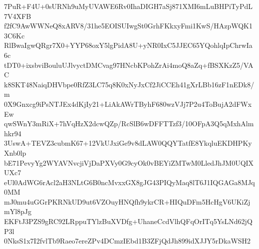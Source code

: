 7PuR+F4U+0sURNh9uMyUVAWE6Rv0IhaDIGH7aSj871XMI6mLuBHPiTyPdL7V4XFB
f2fC9AwWWNeQ8xARV8/31he5EOISUIwgSt0GrhFKkxyFmi1KwS/HAzpWQK13C6Kc
RlBwaIgwQRgr7X0+YYP68oxY5lgPidA8U+yNR0IxC5JJEC65YQohlqIpChrwIa6c
tDT0+ixsbviBouluUJlvyctDMCvag97HNcbKPohZrAi4moQ8aZq+fBSXKzZ5/VAC
k8SKT48NaiqDHVbpe0RfZ3LC75q8K0xNyJxCf2JiCCEh41gXrLBb16zF1nEDk8/m
0X9Gnxcg9iPsNTJEx4dKjIy21+LiAkAWrTByhF680wzVJj7P2u4ToBujA2dFWxEw
qwSWnY3mRiX+7hVqHzX2dcwQZp/RcSlB6wDFFTTzf3/10OFpA3Q5qMxhAlmhkr94
3UswA+TEVZ3cubmK67+12VkUJxiGe9v8dLAW0QQYTatfE8YkqluEKDHPKyXnb0lp
bE71PevyYg2WYAVNvcjiVjDaPXVy0G9cyOk0vBEYiZMTwM0LledJhJM0UQIXUXc7
eUl0AdWG6rAcl2aH3NLtG6B0ncMvxxGX8gJG43PIQyMaq8lT6J1IQGAGa8MJq0MM
mJ0mu4uGGrPKRNkUD9ut6VZOuyHNQfh9ykrCR+HIQuDFm5HcHgV6UKiZjmYl8pJg
EKFtJ3PZS9gRC92LRppuTYlzBuXVDfg+UhaneCcdVlhQFqOrITq5YsLNd62jQP3l
0NksS1x7I2fvlTb9Raeo7ereZPv4DCmzIEbd1B3ZFjQdJh899idXJJY5rDkaWSH2
